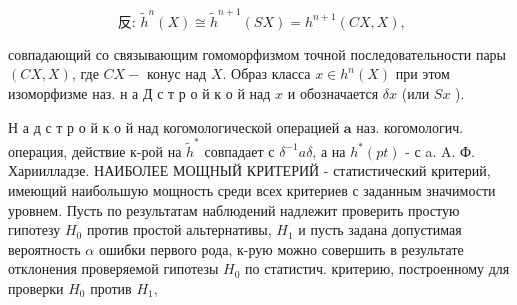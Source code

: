 \documentclass[10pt]{article}
\begin{document}
\[

\text { 反: } \tilde{h}^{n}(X) \cong \tilde{h}^{n+1}(S X)=h^{n+1}(C X, X),

\]



совпадающий со связывающим гомоморфизмом точной последовательности пары $(C X, X)$, где $C X-$ конус над $X$. Образ класса $x \in h^{n}(X)$ при этом изоморфизме наз. н а Д с т р о й к о й над $x$ и обозначается $\delta x$ (или $S x$ ).



Н а д с т р о й к о й над когомологической операцией $\boldsymbol{a}$ наз. когомологич. операция, действие к-рой на $\tilde{h}^{*}$ совпадает с $\delta^{-1} a \delta$, а на $h^{*}(p t)$ - с a. A. Ф. Хариилладзе. НАИБОЛЕЕ МОЩНЫЙ КРИТЕРИЙ - статистический критерий, имеющий наибольшую мощность среди всех критериев с заданным значимости уровнем. Пусть по результатам наблюдений надлежит проверить простую гипотезу $H_{0}$ против простой альтернативы, $H_{1}$ и пусть задана допустимая вероятность $\alpha$ ошибки первого рода, к-рую можно совершить в результате отклонения проверяемой гипотезы $H_{0}$ по статистич. критерию, построенному для проверки $H_{0}$ против $H_{1}$,
\end{document}

